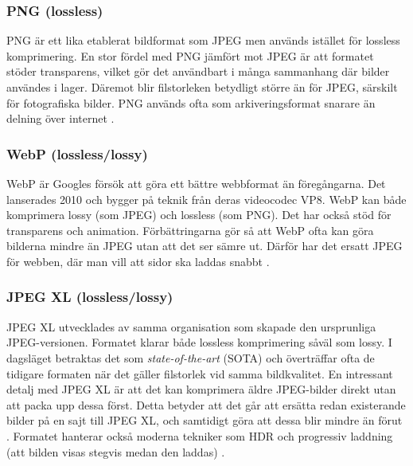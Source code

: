 \subsubsection*{PNG (lossless)}
PNG är ett lika etablerat bildformat som JPEG men används istället för lossless komprimering.
En stor fördel med PNG jämfört mot JPEG är att formatet stöder transparens, vilket gör det användbart i många
sammanhang där bilder användes i lager. Däremot blir filstorleken betydligt större än för
JPEG, särskilt för fotografiska bilder. PNG används ofta som arkiveringsformat snarare än delning över internet \cite{boutell1997png}.



\subsubsection*{WebP (lossless/lossy)}
WebP är Googles försök att göra ett bättre webbformat än föregångarna. Det lanserades  2010 och  bygger på
teknik från deras videocodec VP8. WebP kan både komprimera  lossy (som JPEG) och
lossless (som PNG). Det har också stöd för transparens och animation.
Förbättringarna gör så att WebP ofta kan göra bilderna mindre än JPEG utan att det ser sämre ut. Därför
har det ersatt JPEG för webben, där man vill att sidor ska laddas snabbt \cite{google2023webp}.




\subsubsection*{JPEG XL (lossless/lossy)}
JPEG XL utvecklades av samma organisation som skapade den ursprunliga JPEG-versionen. Formatet klarar både lossless komprimering såväl som lossy. I dagsläget betraktas det som \emph{state-of-the-art} (SOTA) och överträffar ofta de tidigare formaten när det gäller filstorlek vid samma bildkvalitet. 
En intressant detalj med JPEG XL är att det kan komprimera äldre JPEG-bilder direkt utan att packa upp dessa först. 
 Detta betyder att det går att ersätta redan existerande bilder på en sajt till JPEG XL,
och samtidigt göra att dessa blir mindre än förut \cite{jpegxl_whitepaper_2023}. Formatet hanterar också moderna tekniker som HDR och progressiv laddning (att bilden visas stegvis medan den laddas) \cite{jpegxl_whitepaper_2023}.